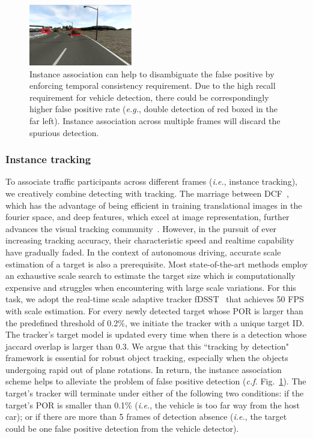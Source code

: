 \documentclass[10pt,twocolumn,letterpaper]{article}
\begin{document}
\begin{figure}[t]
        \centering
        \includegraphics[width=0.4\textwidth]{figures/double_detection.png}
        \caption{Instance association can help to disambiguate the false positive by enforcing temporal consistency requirement. Due to the high recall requirement for vehicle detection, there could be correspondingly higher false positive rate (\emph{e.g.}, double detection of red boxed in the far left). Instance association across multiple frames will discard the spurious detection.}
        \label{fig:Instance_association}
\end{figure}



\subsubsection{Instance tracking}

To associate traffic participants across different frames (\emph{i.e.}, instance tracking), we creatively combine detecting with tracking.
The marriage between DCF~\cite{henriques2015high}, which has the advantage of being efficient in training translational images in the fourier space, and deep features, which excel at image representation, further advances the visual tracking community~\cite{qi2016hedged, danelljan2016eccv, wu2017kernalised, danelljan2017eco}. However, in the pursuit of ever increasing tracking accuracy, their characteristic speed and realtime capability have gradually faded. In the context of autonomous driving, accurate scale estimation of a target is also a prerequisite. Most state-of-the-art methods employ an exhaustive scale search to estimate the target size which is computationally expensive and struggles when encountering with large scale variations.
For this task, we adopt the real-time scale adaptive tracker fDSST~\cite{danelljan2017discriminative} that achieves 50 FPS with scale estimation.
For every newly detected target whose POR is larger than the predefined threshold of 0.2\%, we initiate the tracker with a unique target ID. The tracker's target model is updated every time when there is a detection whose jaccard overlap is larger than 0.3. We argue that this ``tracking by detection" framework is essential for robust object tracking, especially when the objects undergoing rapid out of plane rotations. In return, the instance association scheme helps to alleviate the problem of false positive detection (\emph{c.f.} Fig.~\ref{fig:Instance_association}).
The target's tracker will terminate under either of the following two conditions: if the target's POR is smaller than 0.1\% (\emph{i.e.}, the vehicle is too far way from the host car); or if there are more than 5 frames of detection absence  (\emph{i.e.}, the target could be one false positive detection from the vehicle detector).
\end{document}
